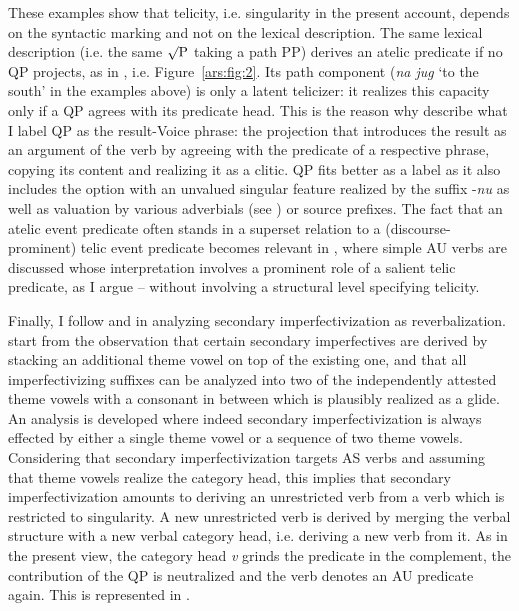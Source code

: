 \documentclass[output=paper]{langscibook}
\begin{document}
These examples show that telicity, i.e. singularity in the present account, depends on the syntactic marking and not on the lexical description. The same lexical description (i.e. the same $\surd\text{P}$ taking a path PP) derives an atelic predicate if no QP projects, as in , i.e. Figure~\ref{ars:fig:2}. Its path component  (\textit{na jug} `to the south' in the examples above) is only a latent telicizer: it realizes this capacity only if a QP agrees with its predicate head. This is the reason why \citet{Quaglia.2021} describe what I label QP as the result-Voice phrase: the projection that introduces the result as an argument of the verb by agreeing with the predicate of a respective phrase, copying its content and realizing it as a clitic. QP fits better as a label as it also includes the option with an unvalued singular feature realized by the suffix -\textit{nu} as well as valuation by various adverbials (see ) or source prefixes. The fact that an atelic event predicate often stands in a superset relation to a (discourse-prominent) telic event predicate becomes relevant in , where simple AU verbs are discussed whose interpretation involves a prominent role of a salient telic predicate, as I argue -- without involving a structural level specifying telicity.

Finally, I follow \citet{Arsenij.2018a} and \citet{SimMilAr2021} in analyzing secondary imperfectivization as reverbalization. \citet{SimMilAr2021} start from the observation that certain secondary imperfectives are derived by stacking an additional theme vowel on top of the existing one, and that all imperfectivizing suffixes can be analyzed into two of the independently attested theme vowels with a consonant in between which is plausibly realized as a glide. An analysis is developed where indeed secondary imperfectivization is always effected by either a single theme vowel or a sequence of two theme vowels. Considering that secondary imperfectivization targets AS verbs and assuming that theme vowels realize the category head, this implies that secondary imperfectivization amounts to deriving an unrestricted verb from a verb which is restricted to singularity. A new unrestricted verb is derived by merging the verbal structure with a new verbal category head, i.e. deriving a new verb from it. As in the present view, the category head \textit{v} grinds the predicate in the complement, the contribution of the QP is neutralized and the verb denotes an AU predicate again. This is represented in .
\end{document}

